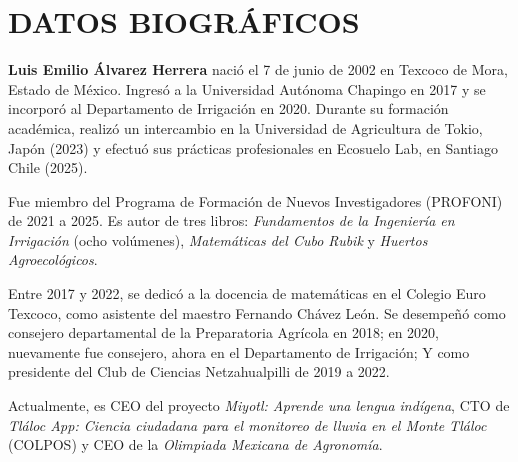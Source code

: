 

\chapter*{DATOS BIOGRÁFICOS}

\textbf{Luis Emilio Álvarez Herrera} nació el 7 de junio de 2002 en Texcoco de Mora, Estado de México. Ingresó a la Universidad Autónoma Chapingo en 2017 y se incorporó al Departamento de Irrigación en 2020. Durante su formación académica, realizó un intercambio en la Universidad de Agricultura de Tokio, Japón (2023) y efectuó sus prácticas profesionales en Ecosuelo Lab, en Santiago Chile (2025).

Fue miembro del Programa de Formación de Nuevos Investigadores (PROFONI) de 2021 a 2025. Es autor de tres libros: \textit{Fundamentos de la Ingeniería en Irrigación} (ocho volúmenes), \textit{Matemáticas del Cubo Rubik} y \textit{Huertos Agroecológicos}.

Entre 2017 y 2022, se dedicó a la docencia de matemáticas en el Colegio Euro Texcoco, como asistente del maestro Fernando Chávez León. Se desempeñó como consejero departamental de la Preparatoria Agrícola en 2018; en 2020, nuevamente fue consejero, ahora en el Departamento de Irrigación; Y como presidente del Club de Ciencias Netzahualpilli de 2019 a 2022. 

Actualmente, es CEO del proyecto \textit{Miyotl: Aprende una lengua indígena}, CTO de \textit{Tláloc App: Ciencia ciudadana para el monitoreo de lluvia en el Monte Tláloc} (COLPOS) y CEO de la \textit{Olimpiada Mexicana de Agronomía}.



